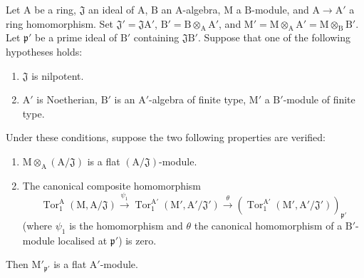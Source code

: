 \begin{lemma}[11.2.5]
\label{IV.11.2.5}
Let $\mathrm{A}$ be a ring, $\mathfrak{J}$ an ideal of $\mathrm{A}$,
$\mathrm{B}$ an $\mathrm{A}$-algebra, $\mathrm{M}$ a
$\mathrm{B}$-module, and $\mathrm{A}\to\mathrm{A}'$ a ring
homomorphism. Set
$\mathfrak{J}'=\mathfrak{J}\mathrm{A}'$,
$\mathrm{B}'=\mathrm{B}\otimes_\mathrm{A}\mathrm{A}'$, and
$\mathrm{M}'=\mathrm{M}\otimes_\mathrm{A}\mathrm{A}'
=\mathrm{M}\otimes_\mathrm{B}\mathrm{B}'$. Let
$\mathfrak{p}'$ be a prime ideal of $\mathrm{B}'$ containing
$\mathfrak{J}\mathrm{B}'$. Suppose that one of the following
hypotheses holds:
\begin{enumerate}[label=\textit{\alph*)}]
  \item $\mathfrak{J}$ is nilpotent.
  \item $\mathrm{A}'$ is Noetherian, $\mathrm{B}'$ is an $\mathrm{A}'$-algebra of finite type, $\mathrm{M}'$ a $\mathrm{B}'$-module of finite type.
\end{enumerate}
Under these conditions, suppose the two following properties are verified:
\begin{enumerate}[label=\emph{(\roman*)}]
  \item $\mathrm{M}\otimes_\mathrm{A}(\mathrm{A}/\mathfrak{J})$ is a flat $(\mathrm{A}/\mathfrak{J})$-module.
  \item The canonical composite homomorphism
\[
  \operatorname{Tor}_1^\mathrm{A}(\mathrm{M},\mathrm{A}/\mathfrak{J})\xrightarrow{\psi_1}\operatorname{Tor}_1^{\mathrm{A}'}(\mathrm{M}',\mathrm{A}'/\mathfrak{J}')\xrightarrow{\theta}(\operatorname{Tor}_1^{\mathrm{A}'}(\mathrm{M}',\mathrm{A}'/\mathfrak{J}'))_{\mathfrak{p}'}
\]
(where $\psi_1$ is the homomorphism  and $\theta$ the canonical homomorphism of a $\mathrm{B}'$-module localised at $\mathfrak{p}'$) is zero.
\end{enumerate}

Then $\mathrm{M}'_{\mathfrak{p}'}$ is a flat $\mathrm{A}'$-module.
\end{lemma}

